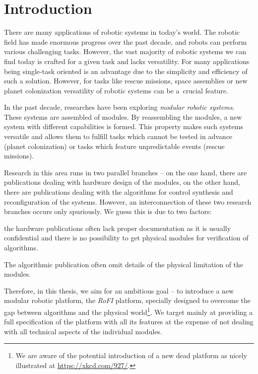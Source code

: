 \chapter{Introduction}\label{chap:introduction}

There are many applications of robotic systems in today's world. The robotic
field has made enormous progress over the past decade, and robots can perform
various challenging tasks. However, the vast majority of robotic systems we can
find today is crafted for a given task and lacks versatility. For many
applications being single-task oriented is an advantage due to the simplicity
and efficiency of such a solution. However, for tasks like rescue missions,
space assemblies or new planet colonization versatility of robotic systems can
be a~crucial feature.

In the past decade, researches have been exploring \emph{modular robotic
systems}. These systems are assembled of modules. By reassembling the modules, a
new system with different capabilities is formed. This property makes such
systems versatile and allows them to fulfill tasks which cannot be tested in
advance (planet colonization) or tasks which feature unpredictable events
(rescue missions).

Research in this area runs in two parallel branches -- on the one hand, there
are publications dealing with hardware design of the modules, on the other hand,
there are publications dealing with the algorithms for control synthesis and
reconfiguration of the systems. However, an interconnection of these two
research branches occurs only spuriously. We guess this is due to two factors:
\begin{enumerate*}
    \item the hardware publications often lack proper documentation as it is
    usually confidential and there is no possibility to get physical modules for
    verification of algorithms.
    \item The algorithmic publication often omit details of the physical
    limitation of the modules.
\end{enumerate*}

Therefore, in this thesis, we aim for an ambitious goal -- to introduce a new
modular robotic platform, the \emph{RoFI} platform, specially designed to
overcome the gap between algorithms and the physical world\footnote{We are aware
of the potential introduction of a new dead platform as nicely illustrated at
\url{https://xkcd.com/927/}.}. We target mainly at providing a full
specification of the platform with all its features at the expense of not
dealing with all technical aspects of the individual modules.

